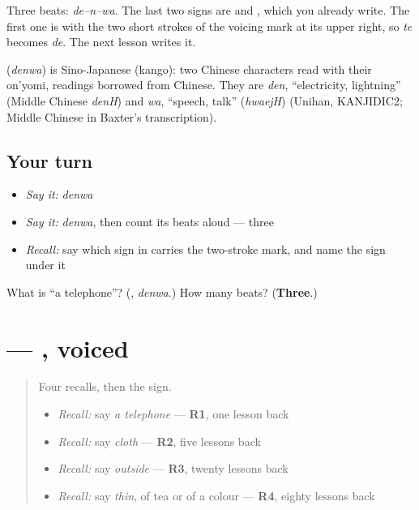 Three beats: \emph{de–n–wa}. The last two signs are \textbf{} and \textbf{}, which you already write. The first one is \textbf{} with the two short strokes of the voicing mark at its upper right, so \emph{te} becomes \emph{de}. The next lesson writes it.

\begin{cousinweb}
\textbf{} (\emph{denwa}) is Sino-Japanese (kango): two Chinese characters read with their on'yomi, readings borrowed from Chinese. They are \emph{den}, \textquotedblleft{}electricity, lightning\textquotedblright{} (Middle Chinese \emph{denH}) and \emph{wa}, \textquotedblleft{}speech, talk\textquotedblright{} (\emph{hwaejH}) (Unihan, KANJIDIC2; Middle Chinese in Baxter's transcription).
\end{cousinweb}

\subsection*{Your turn}
\begin{itemize}
\raggedright
  \item \emph{Say it:} \emph{denwa}
  \item \emph{Say it:} \emph{denwa}, then count its beats aloud — three
  \item \emph{Recall:} say which sign in \textbf{} carries the two-stroke mark, and name the sign under it
\end{itemize}

\begin{tcolorbox}[breakable,colback=teal!4,colframe=teal!35!black,title={Before you move on}]
What is \textquotedblleft{}a telephone\textquotedblright{}? (\textbf{}, \emph{denwa}.) How many beats? (\textbf{Three}.)
\end{tcolorbox}
\section[\texorpdfstring{\ja{で} (de)}{で (de)}]{ — , voiced}

\label{lesson:JA-W134-de}



\begin{quote}
Four recalls, then the sign.

\begin{itemize}
\raggedright
  \item \emph{Recall:} say \emph{a telephone} — \textbf{R1}, one lesson back
  \item \emph{Recall:} say \emph{cloth} — \textbf{R2}, five lessons back
  \item \emph{Recall:} say \emph{outside} — \textbf{R3}, twenty lessons back
  \item \emph{Recall:} say \emph{thin}, of tea or of a colour — \textbf{R4}, eighty lessons back
\end{itemize}
\end{quote}

